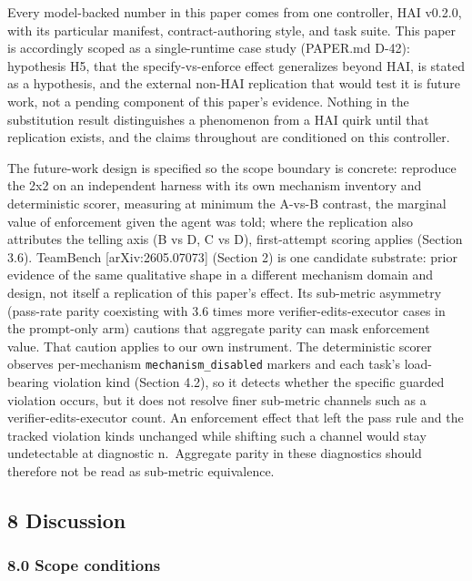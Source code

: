 \documentclass[
]{article}
\begin{document}
Every model-backed number in this paper comes from one controller, HAI
v0.2.0, with its particular manifest, contract-authoring style, and task
suite. This paper is accordingly scoped as a single-runtime case study
(PAPER.md D-42): hypothesis H5, that the specify-vs-enforce effect
generalizes beyond HAI, is stated as a hypothesis, and the external
non-HAI replication that would test it is future work, not a pending
component of this paper's evidence. Nothing in the substitution result
distinguishes a phenomenon from a HAI quirk until that replication
exists, and the claims throughout are conditioned on this controller.

The future-work design is specified so the scope boundary is concrete:
reproduce the 2x2 on an independent harness with its own mechanism
inventory and deterministic scorer, measuring at minimum the A-vs-B
contrast, the marginal value of enforcement given the agent was told;
where the replication also attributes the telling axis (B vs D, C vs D),
first-attempt scoring applies (Section 3.6). TeamBench
{[}arXiv:2605.07073{]} (Section 2) is one candidate substrate: prior
evidence of the same qualitative shape in a different mechanism domain
and design, not itself a replication of this paper's effect. Its
sub-metric asymmetry (pass-rate parity coexisting with 3.6 times more
verifier-edits-executor cases in the prompt-only arm) cautions that
aggregate parity can mask enforcement value. That caution applies to our
own instrument. The deterministic scorer observes per-mechanism
\texttt{mechanism\_disabled} markers and each task's load-bearing
violation kind (Section 4.2), so it detects whether the specific guarded
violation occurs, but it does not resolve finer sub-metric channels such
as a verifier-edits-executor count. An enforcement effect that left the
pass rule and the tracked violation kinds unchanged while shifting such
a channel would stay undetectable at diagnostic n.~Aggregate parity in
these diagnostics should therefore not be read as sub-metric
equivalence.

\subsection{8 Discussion}\label{discussion}

\subsubsection{8.0 Scope conditions}\label{scope-conditions}
\end{document}
